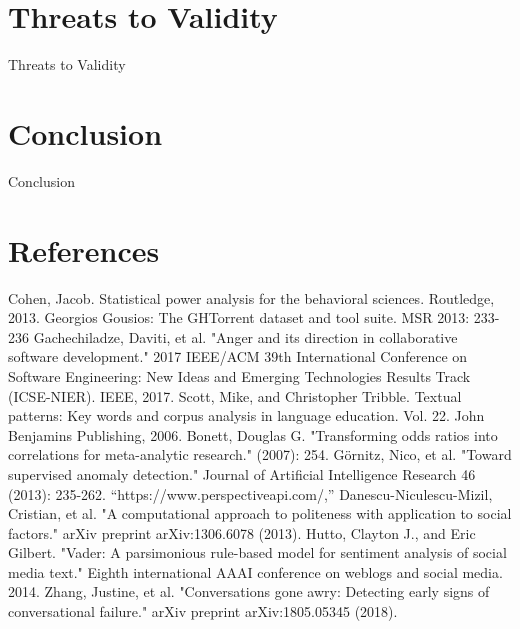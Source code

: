 \documentclass[conference]{IEEEtran}
\begin{document}
\section{Threats to Validity}
Threats to Validity

\section{Conclusion}
Conclusion

\section{References}


\begin{thebibliography}{00}
 Cohen, Jacob. Statistical power analysis for the behavioral sciences. Routledge, 2013.
 Georgios Gousios: The GHTorrent dataset and tool suite. MSR 2013: 233-236
 Gachechiladze, Daviti, et al. "Anger and its direction in collaborative software development." 2017 IEEE/ACM 39th International Conference on Software Engineering: New Ideas and Emerging Technologies Results Track (ICSE-NIER). IEEE, 2017.
 Scott, Mike, and Christopher Tribble. Textual patterns: Key words and corpus analysis in language education. Vol. 22. John Benjamins Publishing, 2006.
 Bonett, Douglas G. "Transforming odds ratios into correlations for meta-analytic research." (2007): 254.
 Görnitz, Nico, et al. "Toward supervised anomaly detection." Journal of Artificial Intelligence Research 46 (2013): 235-262. 
  “https://www.perspectiveapi.com/,”
 Danescu-Niculescu-Mizil, Cristian, et al. "A computational approach to politeness with application to social factors." arXiv preprint arXiv:1306.6078 (2013).
 Hutto, Clayton J., and Eric Gilbert. "Vader: A parsimonious rule-based model for sentiment analysis of social media text." Eighth international AAAI conference on weblogs and social media. 2014.
 Zhang, Justine, et al. "Conversations gone awry: Detecting early signs of conversational failure." arXiv preprint arXiv:1805.05345 (2018).


\end{thebibliography}
\end{document}
